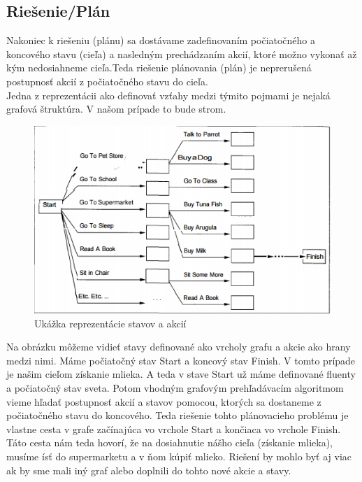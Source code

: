 \subsection{Riešenie/Plán}
Nakoniec k riešeniu (plánu) sa dostávame zadefinovaním počiatočného a koncového stavu (cieľa) a nasledným prechádzaním akcií, ktoré možno vykonať až kým nedosiahneme cieľa.Teda riešenie plánovania (plán) je neprerušená postupnosť akcií z počiatočného stavu do cieľa.\\
Jedna z reprezentácii ako definovať vzťahy medzi týmito pojmami je nejaká grafová štruktúra. V našom prípade to bude strom.
\begin{figure}[ht] 
\begin{center}
\includegraphics[scale=1.0]{img/plan.png}
\caption{Ukážka reprezentácie stavov a akcií}
\label{fig:ch21}
\end{center}
\end{figure}
Na obrázku môžeme vidieť stavy definované ako vrcholy grafu a akcie ako hrany medzi nimi. Máme počiatočný stav Start a koncový stav Finish. V tomto prípade je našim cieľom získanie mlieka. A teda v stave Start už máme definované fluenty a počiatočný stav sveta. Potom vhodným grafovým prehľadávacím algoritmom vieme hľadať postupnosť akcií a stavov pomocou, ktorých sa dostaneme z počiatočného stavu do koncového. Teda riešenie tohto plánovacieho problému je vlastne cesta v grafe začínajúca vo vrchole Start a končiaca vo vrchole Finish. Táto cesta nám teda hovorí, že na dosiahnutie nášho cieľa (získanie mlieka), musíme ísť do supermarketu a v ňom kúpiť mlieko. Riešení by mohlo byť aj viac ak by sme mali iný graf alebo doplnili do tohto nové akcie a stavy.

